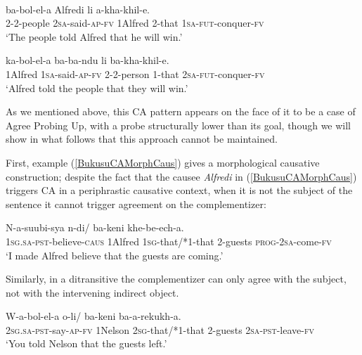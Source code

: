 \documentclass[output=paper
,modfonts
,nonflat
]{langsci/langscibook}
\begin{document}
\ea \label{FirstLubukusuExample}
 \\

\begin{xlist}

\ex
\gll {} ba-bol-el-a Alfredi li	a-kha-khil-e. \\
2-2-people 2\textsc{sa}-said-\textsc{ap}-\textsc{fv} 1Alfred 2-that 1\textsc{sa}-\textsc{fut}-conquer-\textsc{fv} \\
\glt `The people told Alfred that he will win.' 

\ex
\gll {} ka-bol-el-a ba-ba-ndu li ba-kha-khil-e. \\
1Alfred 1\textsc{sa}-said-\textsc{ap}-\textsc{fv} 2-2-person 1-that 2\textsc{sa}-\textsc{fut}-conquer-\textsc{fv} \\
\glt `Alfred told the people that they will win.'

\end{xlist}

\z

\noindent As we mentioned above, this CA pattern appears on the face of it to be a case of Agree Probing Up, with a probe structurally lower than its goal, though we will show in what follows that this approach cannot be maintained.

\noindent First, example (\ref{BukusuCAMorphCaus}) gives a morphological causative construction; despite the fact that the causee \textit{Alfredi} in (\ref{BukusuCAMorphCaus}) triggers CA in a periphrastic causative context, when it is not the subject of the sentence it cannot trigger agreement on the complementizer:

\ea \label{BukusuCAMorphCaus}
\gll N-a-suubi-sya  n-di/ ba-keni khe-be-ech-a. \\
1\textsc{sg}.\textsc{sa}-\textsc{pst}-believe-\textsc{caus} 1Alfred 1\textsc{sg}-that/*1-that 2-guests \textsc{prog}-2\textsc{sa}-come-\textsc{fv} \\
\glt `I made Alfred believe that the guests are coming.'
\z

\noindent Similarly, in a ditransitive the complementizer can only agree with the subject, not with the intervening indirect object.

\ea \label{BukusuCADitransitive}
\gll W-a-bol-el-a  o-li/ ba-keni ba-a-rekukh-a. \\
2\textsc{sg}.\textsc{sa}-\textsc{pst}-say-\textsc{ap}-\textsc{fv}	1Nelson	2\textsc{sg}-that/*1-that	2-guests	2\textsc{sa}-\textsc{pst}-leave-\textsc{fv} \\
\glt `You told Nelson that the guests left.'
\end{document}
